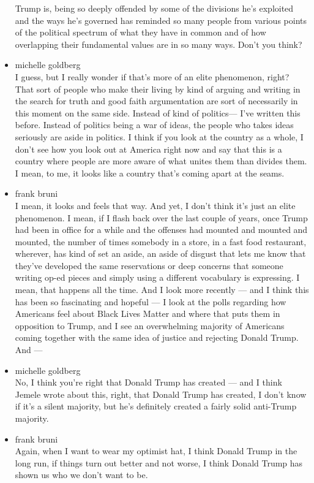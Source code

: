 \begin{itemize}
  Trump is, being so deeply offended by some of the divisions he's
  exploited and the ways he's governed has reminded so many people from
  various points of the political spectrum of what they have in common
  and of how overlapping their fundamental values are in so many ways.
  Don't you think?
\item
  michelle goldberg\\
  I guess, but I really wonder if that's more of an elite phenomenon,
  right? That sort of people who make their living by kind of arguing
  and writing in the search for truth and good faith argumentation are
  sort of necessarily in this moment on the same side. Instead of kind
  of politics--- I've written this before. Instead of politics being a
  war of ideas, the people who takes ideas seriously are aside in
  politics. I think if you look at the country as a whole, I don't see
  how you look out at America right now and say that this is a country
  where people are more aware of what unites them than divides them. I
  mean, to me, it looks like a country that's coming apart at the seams.
\item
  frank bruni\\
  I mean, it looks and feels that way. And yet, I don't think it's just
  an elite phenomenon. I mean, if I flash back over the last couple of
  years, once Trump had been in office for a while and the offenses had
  mounted and mounted and mounted, the number of times somebody in a
  store, in a fast food restaurant, wherever, has kind of set an aside,
  an aside of disgust that lets me know that they've developed the same
  reservations or deep concerns that someone writing op-ed pieces and
  simply using a different vocabulary is expressing. I mean, that
  happens all the time. And I look more recently --- and I think this
  has been so fascinating and hopeful --- I look at the polls regarding
  how Americans feel about Black Lives Matter and where that puts them
  in opposition to Trump, and I see an overwhelming majority of
  Americans coming together with the same idea of justice and rejecting
  Donald Trump. And ---
\item
  michelle goldberg\\
  No, I think you're right that Donald Trump has created --- and I think
  Jemele wrote about this, right, that Donald Trump has created, I don't
  know if it's a silent majority, but he's definitely created a fairly
  solid anti-Trump majority.
\item
  frank bruni\\
  Again, when I want to wear my optimist hat, I think Donald Trump in
  the long run, if things turn out better and not worse, I think Donald
  Trump has shown us who we don't want to be.


\end{itemize}

